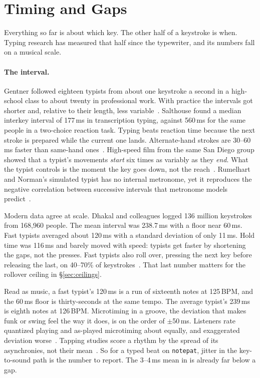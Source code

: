 \documentclass[10pt,letterpaper,twocolumn]{article}
\newcommand{\np}{\texttt{notepat}}
\begin{document}
\section{Timing and Gaps}
\label{sec:timing}

Everything so far is about which key. The other half of a keystroke is when. Typing research has measured that half since the typewriter, and its numbers fall on a musical scale.

\paragraph{The interval.} Gentner followed eighteen typists from about one keystroke a second in a high-school class to about twenty in professional work. With practice the intervals got shorter and, relative to their length, less variable~\citep{gentner1982development,gentner1983keystroke}. Salthouse found a median interkey interval of 177\,ms in transcription typing, against 560\,ms for the same people in a two-choice reaction task. Typing beats reaction time because the next stroke is prepared while the current one lands. Alternate-hand strokes are 30--60\,ms faster than same-hand ones~\citep{salthouse1984age,salthouse1986transcription}. High-speed film from the same San Diego group showed that a typist's movements \emph{start} six times as variably as they \emph{end}. What the typist controls is the moment the key goes down, not the reach~\citep{lnr1982typing}. Rumelhart and Norman's simulated typist has no internal metronome, yet it reproduces the negative correlation between successive intervals that metronome models predict~\citep{rumelhart1982typist}.

Modern data agree at scale. Dhakal and colleagues logged 136 million keystrokes from 168{,}960 people. The mean interval was 238.7\,ms with a floor near 60\,ms. Fast typists averaged about 120\,ms with a standard deviation of only 11\,ms. Hold time was 116\,ms and barely moved with speed: typists get faster by shortening the gaps, not the presses. Fast typists also roll over, pressing the next key before releasing the last, on 40--70\% of keystrokes~\citep{dhakal2018observations}. That last number matters for the rollover ceiling in §\ref{sec:ceilings}.

Read as music, a fast typist's 120\,ms is a run of sixteenth notes at 125\,BPM, and the 60\,ms floor is thirty-seconds at the same tempo. The average typist's 239\,ms is eighth notes at 126\,BPM. Microtiming in a groove, the deviation that makes funk or swing feel the way it does, is on the order of $\pm$50\,ms. Listeners rate quantized playing and as-played microtiming about equally, and exaggerated deviation worse~\citep{senn2016microtiming}. Tapping studies score a rhythm by the spread of its asynchronies, not their mean~\citep{repp2005sms}. So for a typed beat on \np{}, jitter in the key-to-sound path is the number to report. The 3--4\,ms mean in \citet{scudder2026latency} is already far below a gap.
\end{document}
